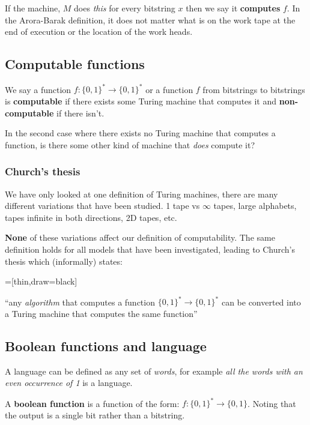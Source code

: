 \documentclass{article}
\begin{document}
If the machine, $M$ does \textit{this} for every bitstring $x$ then we say it \textbf{computes} $f$. In the Arora-Barak definition, it does not matter what is on the work tape at the end of execution or the location of the work heads.

\subsection{Computable functions}

We say a function $f : \{ 0,1 \} ^{*} \rightarrow \{ 0,1 \} ^{*}$ or a function $f$ from bitstrings to bitstrings is \textbf{computable} if there exists some Turing machine that computes it and \textbf{non-computable} if there isn't.

In the second case where there exists no Turing machine that computes a function, is there some other kind of machine that \textit{does} compute it?

\subsubsection{Church's thesis}

We have only looked at one definition of Turing machines, there are many different variations that have been studied. 1 tape vs $\infty$ tapes, large alphabets, tapes infinite in both directions, 2D tapes, etc.

\textbf{None} of these variations affect our definition of computability. The same definition holds for all models that have been investigated, leading to Church's thesis which (informally) states:


=[thin,draw=black]

\begin{thesis}
      ``any \textit{algorithm} that computes a function $\{ 0,1 \} ^{*} \rightarrow \{ 0,1 \} ^{*}$ can be converted into a Turing machine that computes the same function''
\end{thesis}

\subsection{Boolean functions and language}

A language can be defined as any set of \textit{words}, for example \textit{all the words with an even occurrence of 1} is a language.


A \textbf{boolean function} is a function of the form: $f : \{ 0,1 \}^{*} \rightarrow \{ 0,1 \} $. Noting that the output is a single bit rather than a bitstring.
\end{document}
